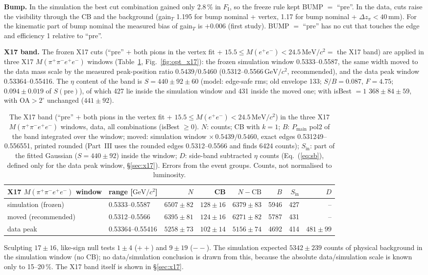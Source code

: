 \documentclass[11pt,a4paper]{article}
\newcommand{\Mfour}{\ensuremath{M(\pi^{+}\pi^{-}e^{+}e^{-})}\xspace}
\newcommand{\Mee}{\ensuremath{M(e^{+}e^{-})}\xspace}
\newcommand{\GeVcc}{\ensuremath{\mathrm{GeV}/c^{2}}\xspace}
\newcommand{\MeVcc}{\ensuremath{\mathrm{MeV}/c^{2}}\xspace}
\newcommand{\dzpi}{\ensuremath{\Delta z_\pi}\xspace}
\newcommand{\Pmain}{\ensuremath{P_{\mathrm{main}}}\xspace}
\begin{document}
\textbf{Bump.} In the simulation the best cut combination gained only 2.8\,\% in $F_{\mathrm{I}}$, so the freeze rule kept BUMP $=$
``pre''. In the data, cuts raise the visibility through the CB and the background (gain$_T$ 1.195 for bump nominal + vertex,
1.17 for bump nominal + $\dzpi<40$\,mm). For the kinematic part of bump nominal the measured bias of gain$_T$ is $+0.006$
(first study). BUMP $=$ ``pre'' has no cut that touches the edge and efficiency 1 relative to ``pre''.

\textbf{X17 band.} The frozen X17 cuts (``pre'' + both pions in the vertex fit + $15.5\le\Mee<24.5$\,\MeVcc $=$ the X17
band) are applied in three X17 \Mfour windows (Table~\ref{tab:x17win}, Fig.~\ref{fig:opt_x17}): the frozen simulation window
0.5333--0.5587, the same width moved to the data mass scale by the measured peak-position ratio $0.5439/0.5460$
(0.5312--0.5566\,\GeVcc, recommended), and the data peak window 0.53364--0.55416. The $\eta$ content of the band is
$S=440\pm92\pm60$ (model: edge-safe rms; old envelope 133; $S/B=0.087$, $F=4.75$; $0.094\pm0.019$ of $S(\mathrm{pre})$), of
which 427 lie inside the simulation window and 431 inside the moved one; with isBest $=1$ $368\pm84\pm59$, with OA$>2^\circ$
unchanged ($441\pm92$).

\begin{table}[H]
\centering
\caption{The X17 band (``pre'' + both pions in the vertex fit + $15.5\le\Mee<24.5$\,\MeVcc) in the three X17 \Mfour windows,
data, all combinations (isBest $\ge0$). $N$: counts; CB with $k=1$; $B$: \Pmain pol2 of the band integrated over the window;
moved: simulation window $\times\,0.5439/0.5460$, exact edges 0.531249--0.556551, printed rounded (Part~III uses the rounded edges
0.5312--0.5566 and finds 6424 counts); $S_{\mathrm{in}}$: part of the fitted Gaussian ($S=440\pm92$) inside the window; $D$: side-band subtracted $\eta$ counts
(Eq.~(\ref{eq:sb}), defined only for the data peak window, \S\ref{sec:x17}). Errors from the event groups. Counts, not
normalised to luminosity.}
\label{tab:x17win}
\small
\setlength{\tabcolsep}{4pt}
\begin{tabular}{@{}l l r r r r r r@{}}
\toprule
X17 \Mfour window & range [\GeVcc] & $N$ & CB & $N-\mathrm{CB}$ & $B$ & $S_{\mathrm{in}}$ & $D$ \\
\midrule
simulation (frozen) & 0.5333--0.5587 & $6507\pm82$ & $128\pm16$ & $6379\pm83$ & 5946 & 427 & -- \\
moved (recommended) & 0.5312--0.5566 & $6395\pm81$ & $124\pm16$ & $6271\pm82$ & 5787 & 431 & -- \\
data peak & 0.53364--0.55416 & $5258\pm73$ & $102\pm14$ & $5156\pm74$ & 4692 & 414 & $481\pm99$ \\
\bottomrule
\end{tabular}
\end{table}
Sculpting $17\pm16$, like-sign null tests $1\pm4$ ($++$) and $9\pm19$ ($--$). The simulation expected $5342\pm239$ counts of
physical background in the simulation window (no CB); no data/simulation conclusion is drawn from this, because the absolute
data/simulation scale is known only to 15--20\,\%. The X17 band itself is shown in \S\ref{sec:x17}.
\end{document}
